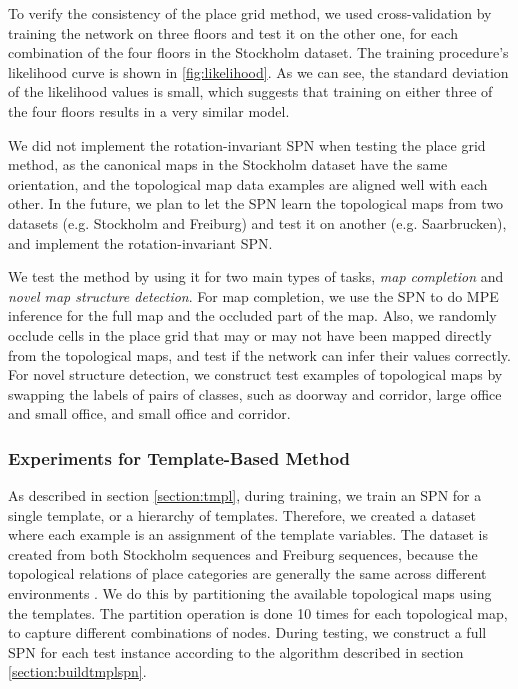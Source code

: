 \documentclass[10pt, titlepage]{article}
\theoremstyle{definition}
\begin{document}
To verify the consistency of the place grid method,  we used cross-validation by training the network on three floors and test it on the other one, for each combination of the four floors in the Stockholm dataset. The training procedure's likelihood curve is shown in \ref{fig:likelihood}. As we can see, the standard deviation of the likelihood values is small, which suggests that training on either three of the four floors results in a very similar model.

We did not implement the rotation-invariant SPN when testing the place grid method, as the canonical maps in the Stockholm dataset have the same orientation, and the topological map data examples are aligned well with each other. In the future, we plan to let the SPN learn the topological maps from two datasets (e.g. Stockholm and Freiburg) and test it on another (e.g. Saarbrucken), and implement the rotation-invariant SPN.

We test the method by using it for two main types of tasks, \textit{map completion} and \textit{novel map structure detection}. For map completion, we use the SPN to do MPE inference for the full map and the occluded part of the map. Also, we randomly occlude cells in the place grid that may or may not have been mapped directly from the topological maps, and test if the network can infer their values correctly. For novel structure detection, we construct test examples of topological maps by swapping the labels of pairs of classes, such as doorway and corridor, large office and small office, and small office and corridor.

\subsubsection{Experiments for Template-Based Method}\label{section:exp-tmpl}

As described in section \ref{section:tmpl}, during training, we train an SPN for a single template, or a hierarchy of templates. Therefore, we created a dataset where each example is an assignment of the template variables. The dataset is created from both Stockholm sequences and Freiburg sequences, because the topological relations of place categories are generally the same across different environments
\cite{aydemir2012can}. We do this by partitioning the available topological maps using the templates. The partition operation is done 10 times for each topological map, to capture different combinations of nodes. During testing, we construct a full SPN for each test instance according to the algorithm described in section \ref{section:buildtmplspn}.
\end{document}
